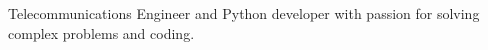 Telecommunications Engineer and Python developer with passion for solving complex problems and coding.